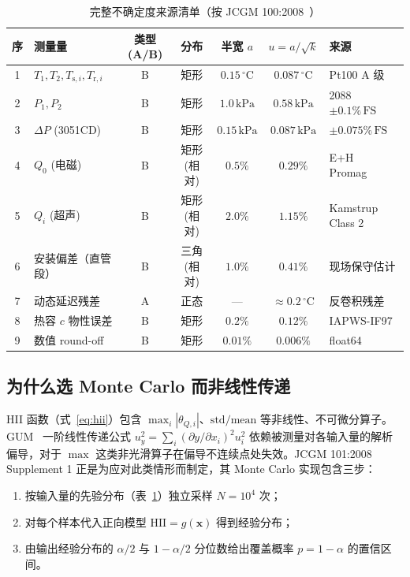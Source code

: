 \documentclass[11pt,a4paper]{ctexart}
\begin{document}
\begin{table}[H]
\centering
\caption{完整不确定度来源清单（按 JCGM 100:2008~\cite{gum100}）}
\label{tab:app_unc}
\small
\begin{tabular}{clccccl}
\toprule
序 & 测量量 & 类型 (A/B) & 分布 & 半宽 $a$ & $u=a/\sqrt{k}$ & 来源 \\
\midrule
1 & $T_1,T_2,T_{\mathrm{s},i},T_{\mathrm{r},i}$ & B & 矩形 & $0.15\,\mathrm{^\circ C}$ & $0.087\,\mathrm{^\circ C}$ & Pt100 A 级~\cite{iec60751} \\
2 & $P_1,P_2$ & B & 矩形 & $1.0\,\mathrm{kPa}$ & $0.58\,\mathrm{kPa}$ & 2088 $\pm 0.1\%\,\mathrm{FS}$ \\
3 & $\Delta P$ (3051CD) & B & 矩形 & $0.15\,\mathrm{kPa}$ & $0.087\,\mathrm{kPa}$ & $\pm 0.075\%\,\mathrm{FS}$ \\
4 & $Q_0$ (电磁) & B & 矩形 (相对) & $0.5\%$ & $0.29\%$ & E+H Promag~\cite{baker2016flow} \\
5 & $Q_i$ (超声) & B & 矩形 (相对) & $2.0\%$ & $1.15\%$ & Kamstrup Class 2~\cite{en1434} \\
6 & 安装偏差（直管段） & B & 三角 (相对) & $1.0\%$ & $0.41\%$ & 现场保守估计 \\
7 & 动态延迟残差 & A & 正态 & --- & $\approx 0.2\,\mathrm{^\circ C}$ & 反卷积残差~\cite{rees2020} \\
8 & 热容 $c$ 物性误差 & B & 矩形 & $0.2\%$ & $0.12\%$ & IAPWS-IF97~\cite{wagner2008iapws} \\
9 & 数值 round-off & B & 矩形 & $0.01\%$ & $0.006\%$ & float64 \\
\bottomrule
\end{tabular}
\end{table}

\subsection{为什么选 Monte Carlo 而非线性传递}
HII 函数（式~\ref{eq:hii}）包含 $\max_i|\theta_{Q,i}|$、$\mathrm{std}/\mathrm{mean}$ 等非线性、不可微分算子。GUM~\cite{gum100} 一阶线性传递公式 $u_y^2 = \sum_i (\partial y/\partial x_i)^2 u_i^2$ 依赖被测量对各输入量的解析偏导，对于 $\max$ 这类非光滑算子在偏导不连续点处失效。JCGM 101:2008~\cite{gum101} Supplement 1 正是为应对此类情形而制定，其 Monte Carlo 实现包含三步：
\begin{enumerate}[leftmargin=*,itemsep=1pt]
    \item 按输入量的先验分布（表~\ref{tab:app_unc}）独立采样 $N=10^4$ 次；
    \item 对每个样本代入正向模型 $\mathrm{HII} = g(\mathbf{x})$ 得到经验分布；
    \item 由输出经验分布的 $\alpha/2$ 与 $1-\alpha/2$ 分位数给出覆盖概率 $p=1-\alpha$ 的置信区间。
\end{enumerate}
\end{document}
